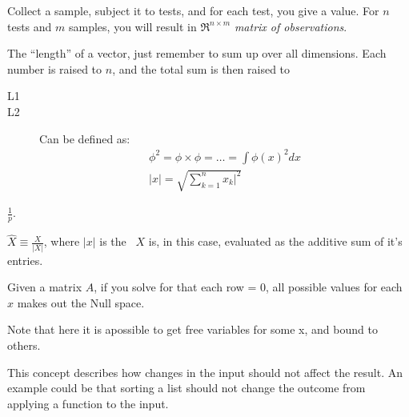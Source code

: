 \begin{definition}
    Collect a sample, subject it to tests, and for each test, you give a value.
    For $n$ tests and $m$ samples, you will result in $\Re^{n\times{m}}$ 
    \textit{matrix of observations}.
\end{definition}

\begin{definition}[Norm]
    The ``length'' of a vector, just remember to sum up over all dimensions.
    Each number is raised to $n$, and the total sum is then raised to

    \begin{description}
        \item[L1]
        \item[L2] Can be defined as:
            \begin{align}
                \phi^{2} = \phi \times \phi =
                \dots = \int{\phi (x)^{2}  dx} \\
                |x| = \sqrt{ \sum\limits_{k = 1}^{n}{x_{k}|^{2}}}
            \end{align}
    \end{description}

    $\frac{1}{p}$.  
\end{definition}

\begin{definition}
    $ \hat{X} \equiv \frac{X}{|X|} $, where $|x|$ is the~
    $X$ is, in this case, evaluated as the additive sum of it's entries.
\end{definition}

\begin{definition}
    Given a matrix $A$, if you solve for that each row = 0,
    all possible values for each $x$ makes out the Null space.

    Note that here it is apossible to get free variables for 
    some x, and bound to others.

\end{definition}

\begin{definition}
    This concept describes how changes in the input should not affect the result.
    An example could be that sorting a list should not change the outcome from
    applying a function to the input.
\end{definition}



